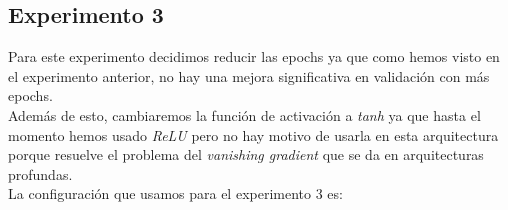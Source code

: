 \documentclass{article}
\begin{document}
		\subsection{Experimento 3}
		\label{s-a1-e3}
			Para este experimento decidimos reducir las epochs ya que como hemos visto en el experimento anterior, no hay una mejora significativa en validaci\'on con m\'as epochs.\\
			Adem\'as de esto, cambiaremos la funci\'on de activaci\'on a \textit{tanh} ya que hasta el momento hemos usado \textit{ReLU} pero no hay motivo de usarla en esta arquitectura porque resuelve el problema del \textit{vanishing gradient} que se da en arquitecturas profundas.\\
			La configuraci\'on que usamos para el experimento 3 es:
			

			
\end{document}
